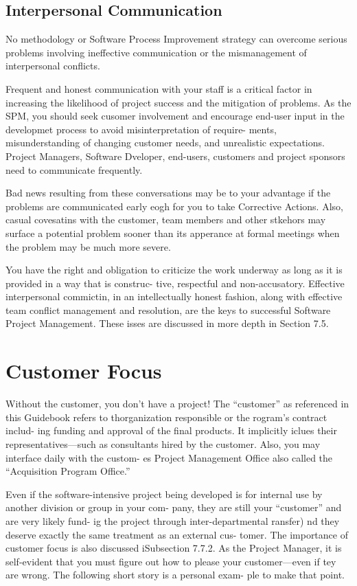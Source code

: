 \documentclass{book}
\begin{document}
\begin{multicols}{2}
\setcounter{section}{6}
\setcounter{subsection}{5}
\subsection{Interpersonal Communication}
No methodology or Software Process Improvement strategy can
overcome serious problems involving ineffective communication
or the mismanagement of interpersonal conflicts.

	Frequent and honest communication with your staff is a
critical factor in increasing the likelihood of project success
and the mitigation of problems. As the SPM, you should seek
cusomer involvement and encourage end-user input in the
developmet process to avoid misinterpretation of require-
ments, misunderstanding of changing customer needs,
and unrealistic expectations. Project Managers, Software
Dveloper, end-users, customers and project sponsors need
to communicate frequently.

	Bad news resulting from these conversations may be
to your advantage if the problems are communicated early
eogh for you to take Corrective Actions. Also, casual
covesatins with the customer, team members and other
stkehors may surface a potential problem sooner than its
apperance at formal meetings when the problem may be
much more severe.

	You have the right and obligation to criticize the work
underway as long as it is provided in a way that is construc-
tive, respectful and non-accusatory. Effective interpersonal
commictin, in an intellectually honest fashion, along
with effective team conflict management and resolution, are
the keys to successful Software Project Management. These
isses are discussed in more depth in Section 7.5.

\section{Customer Focus}
Without the customer, you don’t have a project!
The “customer” as referenced in this Guidebook refers to
thorganization responsible or the rogram’s contract includ-
ing funding and approval of the final products. It implicitly
iclues their representatives—such as consultants hired by
the customer. Also, you may interface daily with the custom-
es Project Management Office also called the “Acquisition
Program Office.”

	Even if the software-intensive project being developed is
for internal use by another division or group in your com-
pany, they are still your “customer” and are very likely fund-
ig the project through inter-departmental ransfer) nd
they deserve exactly the same treatment as an external cus-
tomer. The importance of customer focus is also discussed
iSubsection 7.7.2. As the Project Manager, it is self-evident
that you must figure out how to please your customer—even if
tey are wrong. The following short story is a personal exam-
ple to make that point.


\end{multicols}
\end{document}
